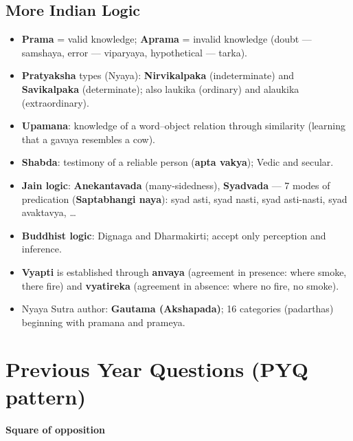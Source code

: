 \endgroup

\needspace{95pt}

\hypertarget{p1-06--85-more-indian-logic}{%
\subsection{More Indian Logic}\label{p1-06--85-more-indian-logic}}

\begin{itemize}
\tightlist
\item
  \textbf{Prama} = valid knowledge; \textbf{Aprama} = invalid knowledge (doubt --- samshaya, error --- viparyaya, hypothetical --- tarka).
\item
  \textbf{Pratyaksha} types (Nyaya): \textbf{Nirvikalpaka} (indeterminate) and \textbf{Savikalpaka} (determinate); also laukika (ordinary) and alaukika (extraordinary).
\item
  \textbf{Upamana}: knowledge of a word--object relation through similarity (learning that a gavaya resembles a cow).
\item
  \textbf{Shabda}: testimony of a reliable person (\textbf{apta vakya}); Vedic and secular.
\item
  \textbf{Jain logic}: \textbf{Anekantavada} (many-sidedness), \textbf{Syadvada} --- 7 modes of predication (\textbf{Saptabhangi naya}): syad asti, syad nasti, syad asti-nasti, syad avaktavya, \ldots{}
\item
  \textbf{Buddhist logic}: Dignaga and Dharmakirti; accept only perception and inference.
\item
  \textbf{Vyapti} is established through \textbf{anvaya} (agreement in presence: where smoke, there fire) and \textbf{vyatireka} (agreement in absence: where no fire, no smoke).
\item
  Nyaya Sutra author: \textbf{Gautama (Akshapada)}; 16 categories (padarthas) beginning with pramana and prameya.
\end{itemize}

\needspace{125pt}

\hypertarget{p1-06--previous-year-questions-pyq-pattern}{%
\section{Previous Year Questions (PYQ pattern)}\label{p1-06--previous-year-questions-pyq-pattern}}

\textbf{Square of opposition}

